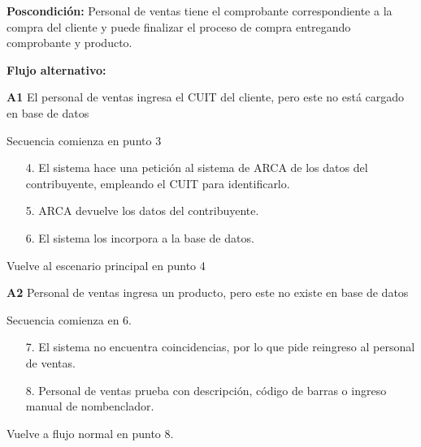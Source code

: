 \textbf{Poscondición:}
Personal de ventas tiene el comprobante correspondiente a la compra del cliente y puede finalizar el proceso de compra entregando comprobante y producto.

\textbf{Flujo alternativo:}

\textbf{A1} El personal de ventas ingresa el CUIT del cliente, pero este no está cargado en base de datos

Secuencia comienza en punto 3

\begin{enumerate}
	\item[4.] El sistema hace una petición al sistema de ARCA de los datos del contribuyente, 
	empleando el CUIT para identificarlo.
	\item[5.] ARCA devuelve los datos del contribuyente.
	\item[6.] El sistema los incorpora a la base de datos.
\end{enumerate}

Vuelve al escenario principal en punto 4

\textbf{A2} Personal de ventas ingresa un producto, pero este no existe en base de datos

Secuencia comienza en 6.

\begin{enumerate}
	\item[7.] El sistema no encuentra coincidencias, por lo que pide reingreso al personal de ventas.
	\item[8.] Personal de ventas prueba con descripción, código de barras o ingreso manual de nombenclador.
\end{enumerate}

Vuelve a flujo normal en punto 8.

\pagebreak

